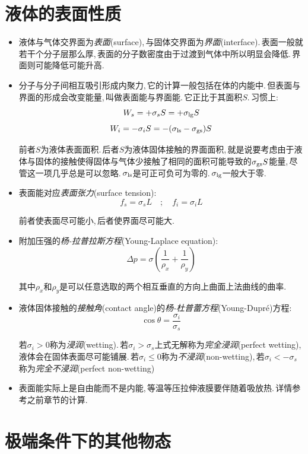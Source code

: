 \section{液体的表面性质}
\begin{itemize}
	\item 液体与气体交界面为\emph{表面}(surface),\,与固体交界面为\emph{界面}(interface).\,表面一般就若干个分子层那么厚,\,表面的分子数密度由于过渡到气体中所以明显会降低.\,界面则可能降低可能升高.
	\item 分子与分子间相互吸引形成内聚力,\,它的计算一般包括在体的内能中.\,但表面与界面的形成会改变能量,\,叫做表面能与界面能.\,它正比于其面积$S$.\,习惯上:
	\[W_s=+\sigma_s S=+\sigma_{\rm lg} S\]
	\[W_i=-\sigma_i S=-(\sigma_{\rm ls}-\sigma_{\rm gs})S\]

	前者$S$为液体表面面积.\,后者$S$为液体固体接触的界面面积,\,就是说要考虑由于液体与固体的接触使得固体与气体少接触了相同的面积可能导致的$\sigma_{\rm gs}S$能量,\,尽管这一项几乎总是可以忽略.\,$\sigma_{\rm ls}$是可正可负可为零的.\,$\sigma_{\rm lg}$一般大于零.

	\item 表面能对应\emph{表面张力}(surface tension):
	\[f_s=\sigma_s L\quad ;\quad f_i=\sigma_i L\]

	前者使表面尽可能小,\,后者使界面尽可能大.

	\item 附加压强的\emph{杨-拉普拉斯方程}(Young-Laplace equation):
	\[\Delta p=\sigma(\frac{1}{\rho_x}+\frac{1}{\rho_y})\]

	其中$\rho_x$和$\rho_y$是可以任意选取的两个相互垂直的方向上曲面上法曲线的曲率.

	\item 液体固体接触的\emph{接触角}(contact angle)的\emph{杨-杜普蕾方程}(Young-Dupr\'e)方程:
	\[\cos\theta=\frac{\sigma_i}{\sigma_s}\]

	若$\sigma_i>0$称为\emph{浸润}(wetting).\,若$\sigma_i>\sigma_s$上式无解称为\emph{完全浸润}(perfect wetting),\,液体会在固体表面尽可能铺展.\,若$\sigma_i\leq 0$称为\emph{不浸润}(non-wetting),\,若$\sigma_i<-\sigma_s$称为\emph{完全不浸润}(perfect non-wetting)

	\item 表面能实际上是自由能而不是内能,\,等温等压拉伸液膜要伴随着吸放热.\,详情参考之前章节的计算.

\end{itemize}



\section{极端条件下的其他物态}

